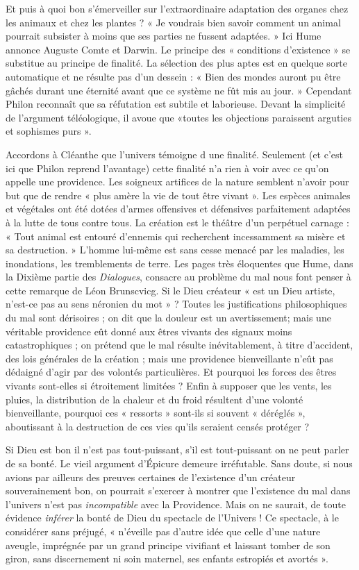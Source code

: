 Et puis à quoi bon s’émerveiller sur l'extraordinaire
adaptation des organes chez les animaux et chez les
plantes ? « Je voudrais bien savoir comment un animal
pourrait subsister à moins que ses parties ne fussent
adaptées. » Ici Hume annonce Auguste Comte et Darwin.
Le principe des « conditions d’existence » se substitue au
principe de finalité. La sélection des plus aptes est en
quelque sorte automatique et ne résulte pas d’un dessein :
« Bien des mondes auront pu être gâchés durant une éternité avant que ce système ne fût mis au jour. » Cependant
Philon reconnaît que sa réfutation est subtile et laborieuse.
Devant la simplicité de l’argument téléologique, il avoue
que «toutes les objections paraissent arguties et sophismes
purs ». 

Accordons à Cléanthe que l’univers témoigne d une
finalité. Seulement (et c’est ici que Philon reprend l’avantage) cette finalité n’a rien à voir avec ce qu'on appelle
une providence. Les soigneux artifices de la nature semblent
n’avoir pour but que de rendre « plus amère la vie de tout
être vivant ». Les espèces animales et végétales ont été
dotées d’armes offensives et défensives parfaitement
adaptées à la lutte de tous contre tous. La création est le
théâtre d’un perpétuel carnage : « Tout animal est entouré
d’ennemis qui recherchent incessamment sa misère et sa
destruction. » L’homme lui-même est sans cesse menacé
par les maladies, les inondations, les tremblements de
terre. Les pages très éloquentes que Hume, dans la
Dixième partie des {\it Dialogues}, consacre au problème du
mal nous font penser à cette remarque de Léon Brunscvicg. Si le Dieu créateur « est un Dieu artiste, n’est-ce
pas au sens néronien du mot » ? Toutes les justifications
philosophiques du mal sont dérisoires ; on dit que la
douleur est un avertissement; mais une véritable providence eût donné aux êtres vivants des signaux moins
catastrophiques ; on prétend que le mal résulte inévitablement, à titre d’accident, des lois générales de la création ; mais une providence bienveillante n’eût pas dédaigné
d’agir par des volontés particulières. Et pourquoi les
forces des êtres vivants sont-elles si étroitement limitées ?
Enfin à supposer que les vents, les pluies, la distribution
de la chaleur et du froid résultent d’une volonté bienveillante, pourquoi ces « ressorts » sont-ils si souvent « déréglés », aboutissant à la destruction de ces vies qu’ils seraient
censés protéger ?

Si Dieu est bon il n’est pas tout-puissant, s’il est tout-puissant on ne peut parler de sa bonté. Le vieil argument
d’Épicure demeure irréfutable. Sans doute, si nous avions
par ailleurs des preuves certaines de l’existence d’un
créateur souverainement bon, on pourrait s’exercer à
montrer que l’existence du mal dans l’univers n’est pas
{\it incompatible} avec la Providence. Mais on ne saurait, de
toute évidence {\it inférer} la bonté de Dieu du spectacle de
l’Univers ! Ce spectacle, à le considérer sans préjugé,
« n’éveille pas d’autre idée que celle d’une nature aveugle,
imprégnée par un grand principe vivifiant et laissant
tomber de son giron, sans discernement ni soin maternel,
ses enfants estropiés et avortés ».

